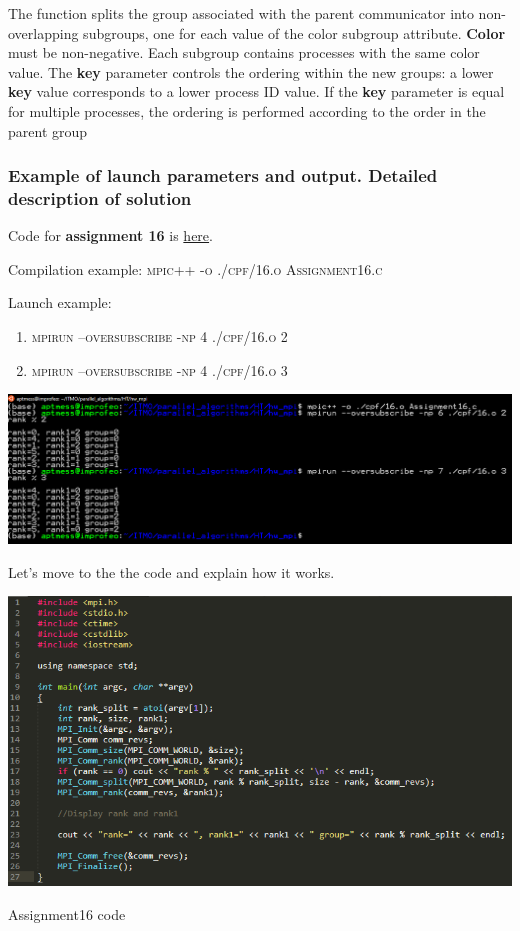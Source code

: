 \documentclass[%
12pt, %
final, %
oneside, %
onecolumn, %
centertags]{article} %
\theoremstyle{plain}
\theoremstyle{definition}
\theoremstyle{remark}
\begin{document}
The function splits the group associated with the parent communicator into non-overlapping subgroups, one 
for each value of the color subgroup attribute. \textbf{Color} must be non-negative. Each subgroup contains 
processes with the same color value. The \textbf{key} parameter controls the ordering within the new groups: a 
lower \textbf{key} value corresponds to a lower process ID value. If the \textbf{key} parameter is equal for multiple 
processes, the ordering is performed according to the order in the parent group

\subsubsection{Example of launch parameters and output. Detailed description of solution}

Code for \textbf{assignment 16} is \href{https:\//github.com/aptmess/parallel_algorithms/blob/master/HT/hw_mpi/Assignment16.c}{here}.

Compilation example: \textsc{mpic++ -o ./cpf/16.o Assignment16.c}

Launch example: 

\begin{enumerate}
	\item \textsc{mpirun --oversubscribe -np 4 ./cpf/16.o 2}
	\item \textsc{mpirun --oversubscribe -np 4 ./cpf/16.o 3}
\end{enumerate}

\begin{center}
\includegraphics[scale=0.55]{16.png}
\end{center}

Let's move to the the code and explain how it works.

\begin{center}
\includegraphics[scale=0.9]{16.code.png}

Assignment16 code
\end{center}
\end{document}
